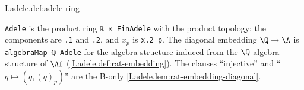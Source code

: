 \begin{definition}[adeles]
\end{definition}
\begin{tfformal}{I.adele.def:adele-ring}
\begin{tffidelity}
\texttt{Adele} is the product ring \texttt{ℝ × FinAdele} with the product topology; the components are \texttt{.1} and \texttt{.2}, and $x_p$ is \texttt{x.2 p}. The diagonal embedding $\Q\to\A$ is \texttt{algebraMap ℚ Adele} for the algebra structure induced from the $\Q$-algebra structure of $\Af$ (\cref{I.adele.def:rat-embedding}). The clauses ``injective'' and ``$q\mapsto(q,(q)_p)$'' are the B-only \cref{I.adele.lem:rat-embedding-diagonal}.
\end{tffidelity}
\end{tfformal}

